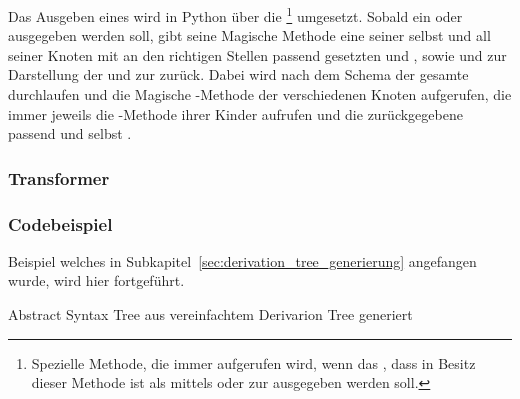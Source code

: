 Das Ausgeben eines  wird in Python über die  \footnote{Spezielle Methode, die immer aufgerufen wird, wenn das , dass in Besitz dieser Methode ist als  mittels  oder zur  ausgegeben werden soll.} umgesetzt. Sobald ein  oder  ausgegeben werden soll, gibt seine Magische Methode  eine  seiner selbst und all seiner Knoten mit an den richtigen Stellen passend gesetzten   \smalltt{(} und  \smalltt{)} , sowie  \smalltt{,} und  \smalltt{;} zur Darstellung der  und zur  zurück. Dabei wird nach dem  Schema der gesamte  durchlaufen und die Magische -Methode der verschiedenen Knoten aufgerufen, die immer jeweils die -Methode ihrer Kinder aufrufen und die zurückgegebene  passend  und selbst .


\subsubsection{Transformer}

\subsubsection{Codebeispiel}
Beispiel welches in Subkapitel~\ref{sec:derivation_tree_generierung} angefangen wurde, wird hier fortgeführt.

\begin{code}
  \centering
  \caption{Abstract Syntax Tree aus vereinfachtem Derivarion Tree generiert}
  \label{code:abstract_syntax_tree_aus_vereinfachtem_derivarion_tree_generiert}
\end{code}

